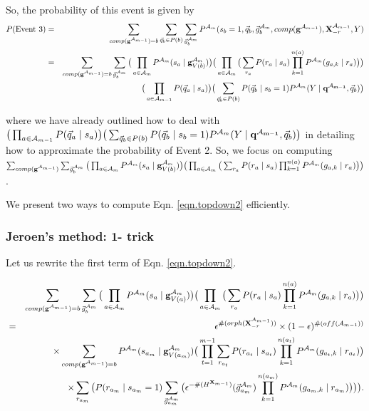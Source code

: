 \documentclass[11pt]{article}
\newcommand{\A}{{\cal A}}
\newcommand{\X}{\mathbf{X}}
\newcommand{\XrmPrev}{\X^{\A_{m-1}}_{-r}}
\newcommand{\Am}{\A_{m}}
\newcommand{\gcompPrev}{comp(\mathbf{g}^{\A_{m-1}})}
\newcommand{\qb}{\vec{q}_b}
\newcommand{\qa}{\vec{q}_a}
\begin{document}
So, the probability of this event is given by
\begin{eqnarray}
P(\text{Event 3}) &=& \sum_{\gcompPrev = b} \sum_{\vec{q}_b \in P(b)} \sum_{\vec{g}^{\Am}_{b}} P^{\Am}(s_b=1, \vec{q}_b, \vec{g}^{\Am}_{b}, \gcompPrev, \XrmPrev, Y) \\
%
&=& \sum_{\gcompPrev = b} \sum_{\vec{g}^{\Am}_{b}} \big( \prod_{a \in {\Am}} P^{\Am}(s_a \mid \mathbf{g}^{\Am}_{V({b})}) \big ) \big( \prod_{a \in {\A_{m}}} \big( \sum_{r_a} P(r_a \mid s_a) \prod_{k=1}^{n(a)} P^{\Am}(g_{a,k} \mid r_a) \big) \big) \label{eqn.topdown2} \\
%
& & \big( \prod_{a \in {\A_{m-1}}} P(\qa \mid s_a)\big) \big( \sum_{\vec{q}_b \in P(b)} P(\qb \mid s_b = 1) P^{\Am}(Y \mid \mathbf{q^{\A_{m-1}}}, \vec{q}_b) \big) \nonumber
\end{eqnarray}

where we have already outlined how to deal with $\big( \prod_{a \in {\A_{m-1}}} P(\qa \mid s_a)\big) \big( \sum_{\vec{q}_b \in P(b)} P(\qb \mid s_b = 1) P^{\Am}(Y \mid \mathbf{q^{\A_{m-1}}}, \vec{q}_b) \big)$ in detailing how to approximate the probability of Event 2. So, we focus on computing $\sum_{\gcompPrev}  \sum_{\vec{g}^{\Am}_{b}} \big( \prod_{a \in {\Am}} P^{\Am}(s_a \mid \mathbf{g}^{\Am}_{V({b})}) \big ) \big( \prod_{a \in {\A_{m}}} \big( \sum_{r_a} P(r_a \mid s_a) \prod_{k=1}^{n(a)} P^{\Am}(g_{a,k} \mid r_a) \big) \big)$.

We present two ways to compute Eqn. \ref{eqn.topdown2} efficiently.


\subsubsection*{Jeroen's method: 1- trick}

Let us rewrite the first term of Eqn. \ref{eqn.topdown2}.

\begin{eqnarray}
& & \sum_{\gcompPrev = b} \sum_{\vec{g}^{\Am}_{b}} \big( \prod_{a \in {\Am}} P^{\Am}(s_a \mid \mathbf{g}^{\Am}_{V({a})}) \big ) \big( \prod_{a \in {\A_{m}}} \big( \sum_{r_a} P(r_a \mid s_a) \prod_{k=1}^{n(a)} P^{\Am}(g_{a,k} \mid r_a) \big) \big)  \\
&=& \epsilon^{\#(orph(\XrmPrev))} \times (1-\epsilon)^{\#(off(\A_{m-1}))}  \label{eqn.topdownAlternate} \\ 
& & \times \sum_{\gcompPrev = b} P^{\Am}(s_{a_m} \mid \mathbf{g}^{\Am}_{V({a_m})}) \big( \prod_{t=1}^{m-1} \sum_{r_{a_t}} P(r_{a_t} \mid s_{a_t}) \prod_{k=1}^{n({a_t})} P^{\Am}(g_{{a_t},k} \mid r_{a_t}) \big)  \nonumber \\
& & \times \sum_{r_{a_m}} \big(P(r_{a_m} \mid s_{a_m} = 1) \sum_{\vec{g}^{\Am}_{{a_m}}} \big( \epsilon^{-\#(H^{\X_{m-1}})}(\vec{g}^{\Am}_{a_m}) \prod_{k=1}^{n({a_m})} P^{\Am}(g_{{a_m},k} \mid r_{a_m}) \big) \big) \big). 
\end{eqnarray}
\end{document}
